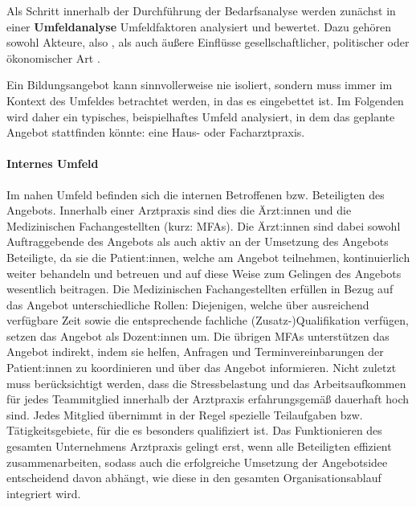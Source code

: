 \documentclass[
  twoside,
  parskip=half-,
  paper=176mm:246mm,
  BCOR=14mm,
  DIV=14,
]{scrreprt}
\begin{document}
Als Schritt innerhalb der Durchführung der Bedarfsanalyse werden zunächst in einer \textbf{Umfeldanalyse} Umfeldfaktoren analysiert und bewertet. Dazu gehören sowohl Akteure, also , als auch äußere Einflüsse gesellschaftlicher, politischer oder ökonomischer Art \autocite{kos}.

\pagebreak

\begin{praxis}
  Ein Bildungsangebot kann sinnvollerweise nie isoliert, sondern muss immer im Kontext des Umfeldes betrachtet werden, in das es eingebettet ist. Im Folgenden wird daher ein typisches, beispielhaftes Umfeld analysiert, in dem das geplante Angebot stattfinden könnte: eine Haus- oder Facharztpraxis.

\paragraph{Internes Umfeld} Im nahen Umfeld befinden sich die internen Betroffenen bzw. Beteiligten des Angebots. Innerhalb einer Arztpraxis sind dies die Ärzt:innen und die Medizinischen Fachangestellten (kurz: MFAs). Die Ärzt:innen sind dabei sowohl Auftraggebende des Angebots als auch aktiv an der Umsetzung des Angebots Beteiligte, da sie die Patient:innen, welche am Angebot teilnehmen, kontinuierlich weiter behandeln und betreuen und auf diese Weise zum Gelingen des Angebots wesentlich beitragen. Die Medizinischen Fachangestellten erfüllen in Bezug auf das Angebot unterschiedliche Rollen: Diejenigen, welche über ausreichend verfügbare Zeit sowie die entsprechende fachliche (Zusatz-)Qualifikation verfügen, setzen das Angebot als Dozent:innen um. Die übrigen MFAs unterstützen das Angebot indirekt, indem sie helfen, Anfragen und Terminvereinbarungen der Patient:innen zu koordinieren und über das Angebot informieren. Nicht zuletzt muss berücksichtigt werden, dass die Stressbelastung und das Arbeitsaufkommen für jedes Teammitglied innerhalb der Arztpraxis erfahrungsgemäß dauerhaft hoch sind. Jedes Mitglied übernimmt in der Regel spezielle Teilaufgaben bzw. Tätigkeitsgebiete, für die es besonders qualifiziert ist. Das Funktionieren des gesamten Unternehmens Arztpraxis gelingt erst, wenn alle Beteiligten effizient zusammenarbeiten, sodass auch die erfolgreiche Umsetzung der Angebotsidee entscheidend davon abhängt, wie diese in den gesamten Organisationsablauf integriert wird.


\end{praxis}
\end{document}
